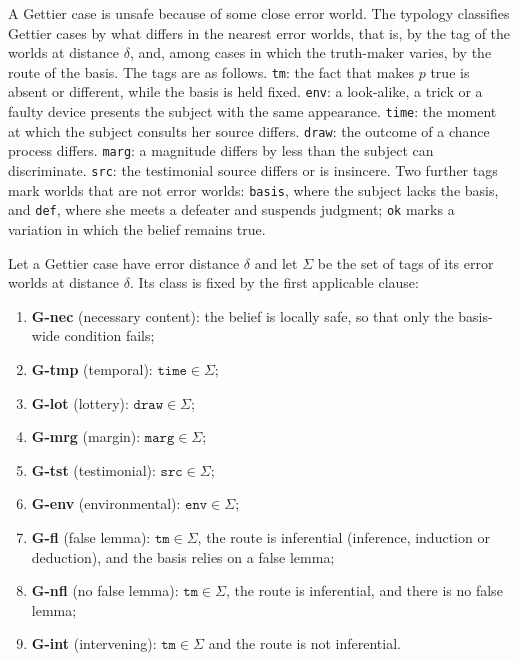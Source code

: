 \documentclass{situationist-preprint}
\begin{document}
A Gettier case is unsafe because of some close error world. The typology classifies Gettier cases by what differs in the nearest error worlds, that is, by the tag of the worlds at distance $\delta$, and, among cases in which the truth-maker varies, by the route of the basis. The tags are as follows. \texttt{tm}: the fact that makes $p$ true is absent or different, while the basis is held fixed. \texttt{env}: a look-alike, a trick or a faulty device presents the subject with the same appearance. \texttt{time}: the moment at which the subject consults her source differs. \texttt{draw}: the outcome of a chance process differs. \texttt{marg}: a magnitude differs by less than the subject can discriminate. \texttt{src}: the testimonial source differs or is insincere. Two further tags mark worlds that are not error worlds: \texttt{basis}, where the subject lacks the basis, and \texttt{def}, where she meets a defeater and suspends judgment; \texttt{ok} marks a variation in which the belief remains true.

\begin{definition}\label{d:classes}
Let a Gettier case have error distance $\delta$ and let $\Sigma$ be the set of tags of its error worlds at distance $\delta$. Its class is fixed by the first applicable clause:
\begin{enumerate}[label=(\roman*)]
\item \textbf{G-nec} (necessary content): the belief is locally safe, so that only the basis-wide condition fails;
\item \textbf{G-tmp} (temporal): $\texttt{time} \in \Sigma$;
\item \textbf{G-lot} (lottery): $\texttt{draw} \in \Sigma$;
\item \textbf{G-mrg} (margin): $\texttt{marg} \in \Sigma$;
\item \textbf{G-tst} (testimonial): $\texttt{src} \in \Sigma$;
\item \textbf{G-env} (environmental): $\texttt{env} \in \Sigma$;
\item \textbf{G-fl} (false lemma): $\texttt{tm} \in \Sigma$, the route is inferential (inference, induction or deduction), and the basis relies on a false lemma;
\item \textbf{G-nfl} (no false lemma): $\texttt{tm} \in \Sigma$, the route is inferential, and there is no false lemma;
\item \textbf{G-int} (intervening): $\texttt{tm} \in \Sigma$ and the route is not inferential.
\end{enumerate}
\end{definition}
\end{document}

